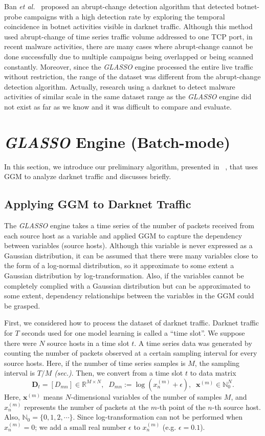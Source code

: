 \documentclass[conference]{IEEEtran}
\begin{document}
Ban {\it et al.}~\cite{Ban} proposed an abrupt-change detection algorithm that detected botnet-probe campaigns with a high detection rate by exploring the temporal coincidence in botnet activities visible in darknet traffic.
Although this method used abrupt-change of time series traffic volume addressed to one TCP port, in recent malware activities, there are many cases where abrupt-change cannot be done successfully due to multiple campaigns being overlapped or being scanned constantly.
Moreover, since the {\it GLASSO} engine processed the entire live traffic without restriction, the range of the dataset was different from the abrupt-change detection algorithm.
Actually, research using a darknet to detect malware activities of similar scale in the same dataset range as the {\it GLASSO} engine did not exist as far as we know and it was difficult to compare and evaluate.




\section{{\it GLASSO} Engine (Batch-mode)}
In this section, we introduce our preliminary algorithm, presented in ~\cite{Han}, that uses GGM to analyze darknet traffic and discusses briefly.


\subsection{Applying GGM to Darknet Traffic}
The {\it GLASSO} engine takes a time series of the number of packets received from each source host as a variable and applied GGM to capture the dependency between variables (source hosts).
Although this variable is never expressed as a Gaussian distribution, it can be assumed that there were many variables close to the form of a log-normal distribution, so it approximate to some extent a Gaussian distribution by log-transformation.
Also, if the variables cannot be completely complied with a Gaussian distribution but can be approximated to some extent, dependency relationships between the variables in the GGM could be grasped.

First, we considered how to process the dataset of darknet traffic.
Darknet traffic for $T$ seconds used for one model learning is called a ``time slot''.
We suppose there were $N$ source hosts in a time slot $t$.
A time series data was generated by counting the number of packets observed at a certain sampling interval for every source hosts.
Here, if the number of time series samples is $M$, the sampling interval is $T/M$ {\it (sec.)}.
Then, we convert from a time slot $t$ to data matrix
\begin{equation*}
\bm{D}_t=[D_{mn}]\in\mathbb{R}^{M \times N},
\;\;D_{mn} := \log(x_n^{(m)}+\epsilon),
\;\;\bm{x}^{(m)}\in\mathbb{N}_0^{N}.
\end{equation*}
Here, $\bm{x}^{(m)}$ means $N$-dimensional variables of the number of samples $M$, and $x_n^{(m)}$ represents the number of packets at the $m$-th point of the $n$-th source host.
Also, $\mathbb{N}_0=\{0,1,2,\cdots\}$.
Since log-transformation can not be performed when $x_n^{(m)}=0$; we add a small real number $\epsilon$ to $x_n^{(m)}$ (e.g. $\epsilon=0.1$).
\end{document}
